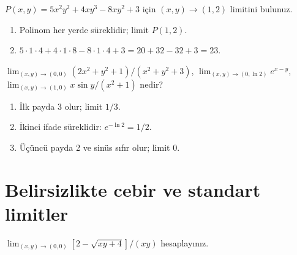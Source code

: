 \begin{tcolorbox}[title={Örnek 4.6 | Polinom limiti},colframe=accent]\(P(x,y)=5x^2y^2+4xy^3-8xy^2+3\) için \((x,y)\to(1,2)\) limitini bulunuz.
\par{}\end{tcolorbox}
\begin{tcolorbox}[title={Adım adım çözüm},colback=green!3!white,colframe=green]\begin{enumerate}
\item Polinom her yerde süreklidir; limit \(P(1,2)\).
\item \(5\cdot1\cdot4+4\cdot1\cdot8-8\cdot1\cdot4+3=20+32-32+3=23\).
\end{enumerate}\end{tcolorbox}
\begin{tcolorbox}[title={Örnek 4.7 | Dersin kısa limitleri},colframe=accent]\(\lim_{(x,y)\to(0,0)}(2x^2+y^2+1)/(x^2+y^2+3)\), \(\lim_{(x,y)\to(0,\ln2)}e^{x-y}\), \(\lim_{(x,y)\to(1,0)}x\sin y/(x^2+1)\) nedir?
\par{}\end{tcolorbox}
\begin{tcolorbox}[title={Adım adım çözüm},colback=green!3!white,colframe=green]\begin{enumerate}
\item İlk payda 3 olur; limit \(1/3\).
\item İkinci ifade süreklidir: \(e^{-\ln2}=1/2\).
\item Üçüncü payda 2 ve sinüs sıfır olur; limit 0.
\end{enumerate}\end{tcolorbox}
\section{Belirsizlikte cebir ve standart limitler}
\begin{tcolorbox}[title={Örnek 4.8 | Eşlenikle sadeleştirme},colframe=accent]\(\lim_{(x,y)\to(0,0)}[2-\sqrt{xy+4}]/(xy)\) hesaplayınız.
\par{}\end{tcolorbox}
